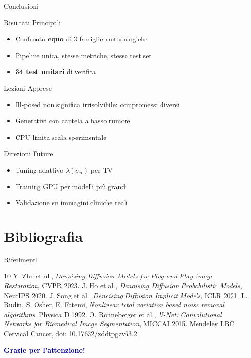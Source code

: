 \documentclass[italian,10pt]{beamer}
\begin{document}
\begin{frame}{Conclusioni}
  \begin{block}{Risultati Principali}
    \begin{itemize}
      \item Confronto \textbf{equo} di 3 famiglie metodologiche
      \item Pipeline unica, stesse metriche, stesso test set
      \item \textbf{34 test unitari} di verifica
    \end{itemize}
  \end{block}
  \begin{block}{Lezioni Apprese}
    \begin{itemize}
      \item Ill-posed non significa irrisolvibile: compromessi diversi
      \item Generativi con cautela a basso rumore
      \item CPU limita scala sperimentale
    \end{itemize}
  \end{block}
  \begin{block}{Direzioni Future}
    \begin{itemize}
      \item Tuning adattivo $\lambda(\sigma_n)$ per TV
      \item Training GPU per modelli pi\`u grandi
      \item Validazione su immagini cliniche reali
    \end{itemize}
  \end{block}
\end{frame}

\section{Bibliografia}

\begin{frame}{Riferimenti}
  \footnotesize
  \begin{thebibliography}{10}
     Y. Zhu et al., \emph{Denoising Diffusion Models for Plug-and-Play Image Restoration}, CVPR 2023.
     J. Ho et al., \emph{Denoising Diffusion Probabilistic Models}, NeurIPS 2020.
     J. Song et al., \emph{Denoising Diffusion Implicit Models}, ICLR 2021.
     L. Rudin, S. Osher, E. Fatemi, \emph{Nonlinear total variation based noise removal algorithms}, Physica D 1992.
     O. Ronneberger et al., \emph{U-Net: Convolutional Networks for Biomedical Image Segmentation}, MICCAI 2015.
     Mendeley LBC Cervical Cancer, \href{https://data.mendeley.com/datasets/zddtpgzv63/2}{doi: 10.17632/zddtpgzv63.2}
  \end{thebibliography}
  \vspace{0.5cm}
  \begin{center}
    \Large\textcolor{darkblue}{\textbf{Grazie per l'attenzione!}}
  \end{center}
\end{frame}
\end{document}
